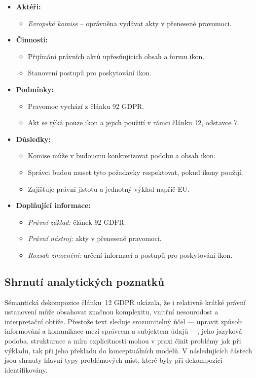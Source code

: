 \begin{itemize}
\item \textbf{Aktéři:}
\begin{itemize}
\item \textit{Evropská komise} – oprávněna vydávat akty v přenesené pravomoci.
\end{itemize}

\item \textbf{Činnosti:}
\begin{itemize}
\item Přijímání právních aktů upřesňujících obsah a formu ikon.
\item Stanovení postupů pro poskytování ikon.
\end{itemize}

\item \textbf{Podmínky:}
\begin{itemize}
\item Pravomoc vychází z článku 92 GDPR.
\item Akt se týká pouze ikon a jejich použití v rámci článku 12, odstavce 7.
\end{itemize}

\item \textbf{Důsledky:}
\begin{itemize}
\item Komise může v budoucnu konkretizovat podobu a obsah ikon.
\item Správci budou muset tyto požadavky respektovat, pokud ikony použijí.
\item Zajišťuje právní jistotu a jednotný výklad napříč EU.
\end{itemize}

\item \textbf{Doplňující informace:}
\begin{itemize}
\item \textit{Právní základ:} článek 92 GDPR.
\item \textit{Právní nástroj:} akty v přenesené pravomoci.
\item \textit{Rozsah zmocnění:} určení informací a postupů pro poskytování ikon.
\end{itemize}
\end{itemize}


\subsection{Shrnutí analytických poznatků}
\label{sec:shrani-analytickych-poznamek}
Sémantická dekompozice článku~12 GDPR ukázala, že i relativně krátké právní ustanovení může obsahovat značnou komplexitu, vnitřní nesourodost a interpretační obtíže. Přestože text sleduje srozumitelný účel — upravit způsob informování a komunikace mezi správcem a subjektem údajů —, jeho jazyková podoba, strukturace a míra explicitnosti mohou v praxi činit problémy jak při výkladu, tak při jeho překladu do konceptuálních modelů. V následujících částech jsou shrnuty hlavní typy problémových míst, které byly při dekompozici identifikovány.

